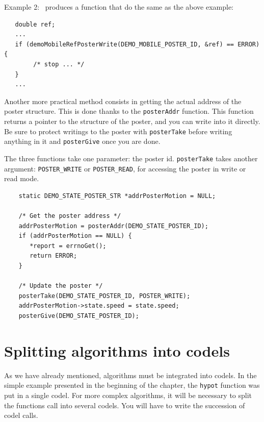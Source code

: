 Example 2:  \GenoM\ produces a  function that  do the  same as  the above
example:

\begin{center}\begin{cartouche}\small\begin{verbatim}
   double ref;
   ...
   if (demoMobileRefPosterWrite(DEMO_MOBILE_POSTER_ID, &ref) == ERROR) {
        /* stop ... */
   }
   ...
\end{verbatim}\end{cartouche}\end{center}

\bigbreak

Another more practical  method consists in getting  the actual address of
the poster   structure.   This is done thanks    to the  \texttt{posterAddr}
function. This function returns a pointer to the structure of the poster,
and you can  write into it directly. Be  sure to protect writings to  the
poster with \texttt{posterTake} before    writing anything in it and    
\texttt{posterGive} once you are done.

The three functions take one  parameter: the poster id. \texttt{posterTake}
takes another  argument:  \texttt{POSTER\_WRITE} or  \texttt{POSTER\_READ}, for
accessing the poster in write or read mode.

\begin{center}\begin{cartouche}\small\begin{verbatim}
    static DEMO_STATE_POSTER_STR *addrPosterMotion = NULL;

    /* Get the poster address */
    addrPosterMotion = posterAddr(DEMO_STATE_POSTER_ID);
    if (addrPosterMotion == NULL) {
       *report = errnoGet();
       return ERROR;
    }

    /* Update the poster */
    posterTake(DEMO_STATE_POSTER_ID, POSTER_WRITE);
    addrPosterMotion->state.speed = state.speed;
    posterGive(DEMO_STATE_POSTER_ID);
\end{verbatim}\end{cartouche}\end{center}


\section{Splitting algorithms into codels}
\label{sec|codels|split}

As   we have   already  mentioned,  algorithms   must  be integrated into
codels. In the simple example presented  in the beginning of the chapter,
the  \texttt{hypot} function  was put in a   single codel.  For more complex
algorithms, it will be necessary to split the functions call into several
codels. You will have to write the succession of codel calls.

